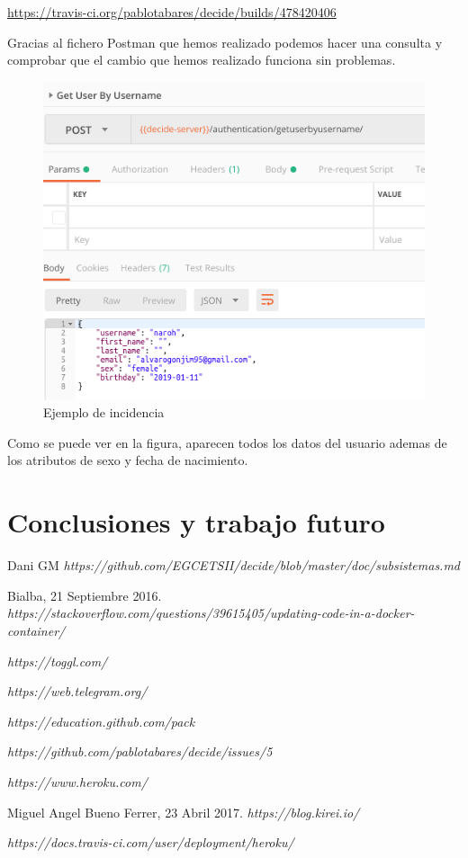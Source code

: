 \documentclass[12pt]{article}
\begin{document}
\url{https://travis-ci.org/pablotabares/decide/builds/478420406}

Gracias al fichero Postman que hemos realizado podemos hacer una consulta y comprobar que el cambio que hemos realizado funciona sin problemas.

\begin{figure}[h]
\centering
\includegraphics[width=1\textwidth]{call.png}
\caption{Ejemplo de incidencia}
\end{figure}

Como se puede ver en la figura, aparecen todos los datos del usuario ademas de los atributos de sexo y fecha de nacimiento.

\section{Conclusiones y trabajo futuro}


\newpage	


\begin{thebibliography}{9}
Dani GM
\textit
{https://github.com/EGCETSII/decide/blob/master/doc/subsistemas.md}

Bialba, 21 Septiembre 2016. 
\textit{https://stackoverflow.com/questions/39615405/updating-code-in-a-docker-container/}

\textit{https://toggl.com/}

\textit{https://web.telegram.org/}

\textit{https://education.github.com/pack}

\textit{https://github.com/pablotabares/decide/issues/5}

\textit{https://www.heroku.com/}

Miguel Angel Bueno Ferrer, 23 Abril 2017. 
\textit{https://blog.kirei.io/}

\textit{https://docs.travis-ci.com/user/deployment/heroku/}




\end{thebibliography}
\end{document}
